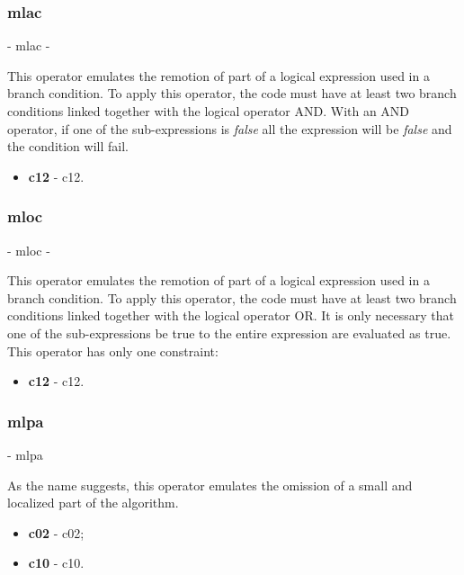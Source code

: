 	\subsubsection{\textbf{\acs{mlac}}} - \Acl{mlac} - 
	\hypertarget{mlac}{}

	This operator emulates the remotion of part of a logical expression used in a branch condition. To apply this operator, the code must have at least two branch conditions linked together with the logical operator AND. With an AND operator, if one of the sub-expressions is \textit{false} all the expression will be \textit{false} and the condition will fail.
	\begin{itemize}
		\item \textbf{\acs{c12}} - \Acl{c12}.
	\end{itemize}

	\subsubsection{\textbf{\acs{mloc}}} - \Acl{mloc} - 
	\hypertarget{mloc}{}

	This operator emulates the remotion of part of a logical expression used in a branch condition. To apply this operator, the code must have at least two branch conditions linked together with the logical operator OR. It is only necessary that one of the sub-expressions be true to the entire expression are evaluated as true. This operator has only one constraint:

	\begin{itemize}
		\item \textbf{\acs{c12}} - \Acl{c12}.
	\end{itemize}

	\subsubsection{\textbf{\acs{mlpa}}} - \Acl{mlpa}
	\hypertarget{mlpa}{}

	As the name suggests, this operator emulates the omission of a small and localized part of the algorithm.

	\begin{itemize}
		\item \textbf{\acs{c02}} - \Acl{c02};
		\item \textbf{\acs{c10}} - \Acl{c10}.
	\end{itemize}

